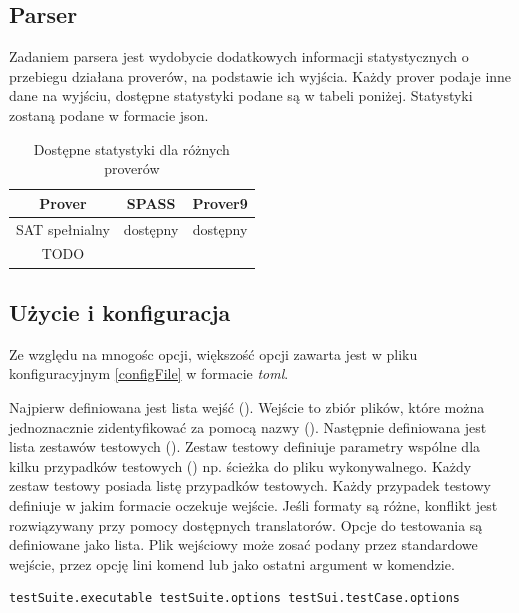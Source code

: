 \documentclass[a4paper,12pt]{article}
\begin{document}
\subsection{Parser} \label{parser}

Zadaniem parsera jest wydobycie dodatkowych informacji statystycznych o przebiegu działana proverów, na podstawie ich wyjścia.
\newline
Każdy prover podaje inne dane na wyjściu, dostępne statystyki podane są w tabeli poniżej.
\newline
Statystyki zostaną podane w formacie json.

\begin{table}[ht]
  \centering
  \caption{Dostępne statystyki dla różnych proverów}
  \begin{tabular}{ |c|c|c| }
    \hline
    Prover & SPASS & Prover9 \\
    \hline
    SAT spełnialny & dostępny & dostępny \\
    \hline
    TODO & & \\
    \hline
  \end{tabular}
\end{table}

\subsection{Użycie i konfiguracja} \label{benchmarkUsage}

Ze względu na mnogośc opcji, większość opcji zawarta jest w pliku konfiguracyjnym \ref{configFile} w formacie \textit{toml}.

Najpierw definiowana jest lista wejść (). Wejście to zbiór plików, które można jednoznacznie zidentyfikować za pomocą nazwy ().
Następnie definiowana jest lista zestawów testowych (). Zestaw testowy definiuje parametry wspólne dla kilku przypadków testowych () np. ścieżka do pliku wykonywalnego. Każdy zestaw testowy posiada listę przypadków testowych. Każdy przypadek testowy definiuje w jakim formacie oczekuje wejście. Jeśli formaty są różne, konflikt jest rozwiązywany przy pomocy dostępnych translatorów. Opcje do testowania są definiowane jako lista. Plik wejściowy może zosać podany przez standardowe wejście, przez opcję lini komend lub jako ostatni argument w komendzie.

\begin{verbatim}
testSuite.executable testSuite.options testSui.testCase.options
\end{verbatim}
\end{document}
